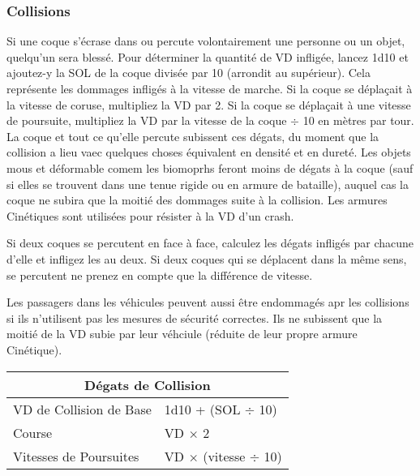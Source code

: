 \subsubsection{Collisions} 

Si une coque s'écrase dans ou percute volontairement une personne ou un objet, quelqu'un sera blessé. Pour déterminer la quantité de VD infligée, lancez 1d10 et ajoutez-y la SOL de la coque divisée par 10 (arrondit au supérieur). Cela représente les dommages infligés à la vitesse de marche. Si la coque se déplaçait à la vitesse de coruse, multipliez la VD par 2. Si la coque se déplaçait à une vitesse de poursuite, multipliez la VD par la vitesse de la coque $\div$ 10 en mètres par tour. La coque et tout ce qu'elle percute subissent ces dégats, du moment que la collision a lieu vaec quelques choses équivalent en densité et en dureté. Les objets mous et déformable comem les biomoprhs feront moins de dégats à la coque (sauf si elles se trouvent dans une tenue rigide ou en armure de bataille), auquel cas la coque ne subira que la moitié des dommages suite à la collision. Les armures Cinétiques sont utilisées pour résister à la VD d'un crash. 

Si deux coques se percutent en face à face, calculez les dégats infligés par chacune d'elle et infligez les au deux. Si deux coques qui se déplacent dans la même sens, se percutent ne prenez en compte que la différence de vitesse. 

Les passagers dans les véhicules peuvent aussi être endommagés apr les collisions si ils n'utilisent pas les mesures de sécurité correctes. Ils ne subissent que la moitié de la VD subie par leur véhciule (réduite de leur propre armure Cinétique). 

\begin{table} \begin{tabular}{|l|l|} \hline

\multicolumn{2}{|c|}{\textbf{Dégats de Collision}}	\\ \hline

VD de Collision de Base	&1d10 + (SOL $\div$ 10)	\\ \hline

Course	&VD $\times$ 2	\\ \hline

Vitesses de Poursuites	&VD $\times$ (vitesse $\div$ 10)	\\ \hline

\end{tabular} \label{tab:collision-damage} \end{table} 

